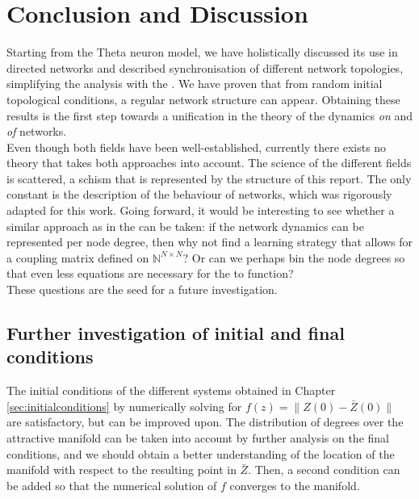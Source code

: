 \newpage
\section{Conclusion and Discussion} \label{sec:ConclusionAndDiscussion}

Starting from the Theta neuron model, we have holistically discussed its use in directed networks and described synchronisation of different network topologies, simplifying the analysis with the \MFR. We have proven that from random initial topological conditions, a regular network structure can appear. Obtaining these results is the first step towards a unification in the theory of the dynamics \textsl{on} and \textsl{of} networks. \\

Even though both fields have been well-established, currently there exists no theory that takes both approaches into account. The science of the different fields is scattered, a schism that is represented by the structure of this report. The only constant is the description of the behaviour of networks, which was rigorously adapted for this work. Going forward, it would be interesting to see whether a similar approach as in the \MFR can be taken: if the network dynamics can be represented per node degree, then why not find a learning strategy that allows for a coupling matrix defined on $\mathbb{N}^{N \times N}$? Or can we perhaps bin the node degrees so that even less equations are necessary for the \MFR to function? \\

These questions are the seed for a future investigation.


\subsection{Further investigation of initial and final conditions}
The initial conditions of the different systems obtained in Chapter \ref{sec:initialconditions} by numerically solving for $f(z) = \| Z(0) - \bar{Z}(0) \|$ are satisfactory, but can be improved upon. The distribution of degrees over the attractive manifold can be taken into account by further analysis on the final conditions, and we should obtain a better understanding of the location of the manifold with respect to the resulting point in $\bar{Z}$. Then, a second condition can be added so that the numerical solution of $f$ converges to the manifold. 

